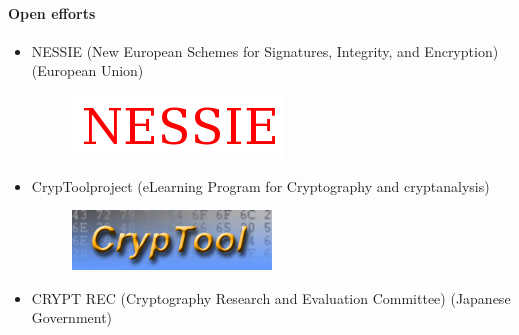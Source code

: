 \documentclass{beamer}
\begin{document}
\begin{frame}
\framesubtitle{Open efforts}
\begin{itemize}
\item NESSIE (New European Schemes for Signatures, Integrity, and Encryption) (European Union)
\begin{figure}
\includegraphics[width=0.3\linewidth]{nessie.png}
\end{figure}
\item CrypToolproject (eLearning Program for Cryptography and cryptanalysis)
\begin{figure}
\includegraphics[width=0.3\linewidth]{cryptool.png}
\end{figure}
\item CRYPT REC (Cryptography Research and Evaluation Committee) (Japanese Government)
\end{itemize}
\end{frame}

\end{document}
